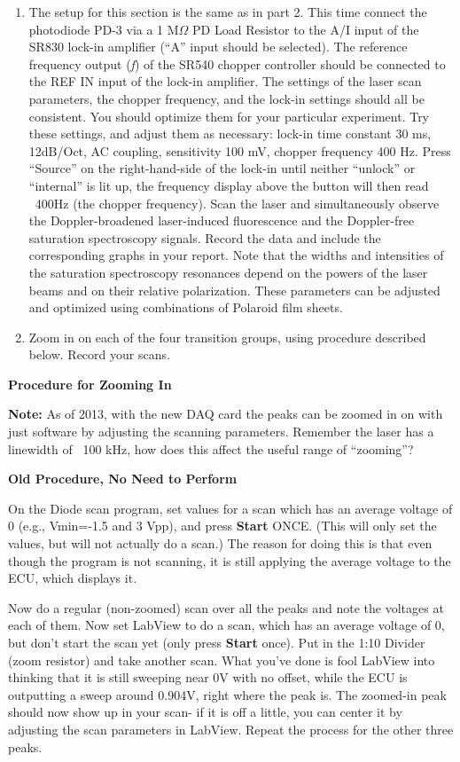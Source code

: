 \documentclass{../lab}
\begin{document}
\begin{enumerate}
    \item The setup for this section is the same as in part 2. This time connect the photodiode PD-3 via a 1 M$ \Omega $ PD Load Resistor to the A/I input of the SR830 lock-in amplifier (``A'' input should be selected). The reference frequency output (\emph{f}) of the SR540 chopper controller should be connected to the REF IN input of the lock-in amplifier. The settings of the laser scan parameters, the chopper frequency, and the lock-in settings should all be consistent. You should optimize them for your particular experiment. Try these settings, and adjust them as necessary: lock-in time constant 30 ms, 12dB/Oct, AC coupling, sensitivity 100 mV, chopper frequency 400 Hz. Press ``Source'' on the right-hand-side of the lock-in until neither ``unlock'' or ``internal'' is lit up, the frequency display above the button will then read ~400Hz (the chopper frequency). Scan the laser and simultaneously observe the Doppler-broadened laser-induced fluorescence and the Doppler-free saturation spectroscopy signals. Record the data and include the corresponding graphs in your report. Note that the widths and intensities of the saturation spectroscopy resonances depend on the powers of the laser beams and on their relative polarization. These parameters can be adjusted and optimized using combinations of Polaroid film sheets.

    \item Zoom in on each of the four transition groups, using procedure described below. Record your scans.

\end{enumerate}

\textbf{Procedure for Zooming In}

\textbf{Note:} As of 2013, with the new DAQ card the peaks can be zoomed in on with just software by adjusting the scanning parameters. Remember the laser has a linewidth of ~100 kHz, how does this affect the useful range of ``zooming''?

\textbf{Old Procedure, No Need to Perform}

On the Diode scan program, set values for a scan which has an average voltage of 0 (e.g., Vmin=-1.5 and 3 Vpp), and press \textbf{Start} ONCE. (This will only set the values, but will not actually do a scan.) The reason for doing this is that even though the program is not scanning, it is still applying the average voltage to the ECU, which displays it.

Now do a regular (non-zoomed) scan over all the peaks and note the voltages at each of them. Now set LabView to do a scan, which has an average voltage of 0, but don't start the scan yet (only press \textbf{Start} once). Put in the 1:10 Divider (zoom resistor) and take another scan. What you've done is fool LabView into thinking that it is still sweeping near 0V with no offset, while the ECU is outputting a sweep around 0.904V, right where the peak is. The zoomed-in peak should now show up in your scan- if it is off a little, you can center it by adjusting the scan parameters in LabView. Repeat the process for the other three peaks.
\end{document}
